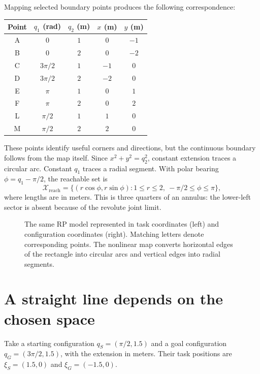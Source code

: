 Mapping selected boundary points produces the following correspondence:
\begin{center}
\begin{tabular}{ccccc}
\toprule
Point & $q_1$ (rad) & $q_2$ (m) & $x$ (m) & $y$ (m)\\
\midrule
A & $0$ & $1$ & $0$ & $-1$\\
B & $0$ & $2$ & $0$ & $-2$\\
C & $3\pi/2$ & $1$ & $-1$ & $0$\\
D & $3\pi/2$ & $2$ & $-2$ & $0$\\
E & $\pi$ & $1$ & $0$ & $1$\\
F & $\pi$ & $2$ & $0$ & $2$\\
L & $\pi/2$ & $1$ & $1$ & $0$\\
M & $\pi/2$ & $2$ & $2$ & $0$\\
\bottomrule
\end{tabular}
\end{center}
These points identify useful corners and directions, but the continuous
boundary follows from the map itself. Since
$x^2+y^2=q_2^2$, constant extension traces a circular arc. Constant $q_1$
traces a radial segment. With polar bearing $\phi=q_1-\pi/2$, the reachable
set is
\begin{equation}
 \mathcal X_{\mathrm{reach}}=
 \{(r\cos\phi,r\sin\phi):1\le r\le2,\ -\pi/2\le\phi\le\pi\},
 \label{eq:l11-sector}
\end{equation}
where lengths are in meters. This is three quarters of an annulus: the
lower-left sector is absent because of the revolute joint limit.

\begin{figure}[htbp]
\centering
\caption{The same RP model represented in task coordinates (left) and
configuration coordinates (right). Matching letters denote corresponding
points. The nonlinear map converts horizontal edges of the rectangle into
circular arcs and vertical edges into radial segments.}
\label{fig:l11-mapped}
\end{figure}

\section{A straight line depends on the chosen space}
\label{sec:l11-straight}
Take a starting configuration $q_S=(\pi/2,1.5)$ and a goal configuration
$q_G=(3\pi/2,1.5)$, with the extension in meters. Their task positions
are $\xi_S=(1.5,0)$ and $\xi_G=(-1.5,0)$.

